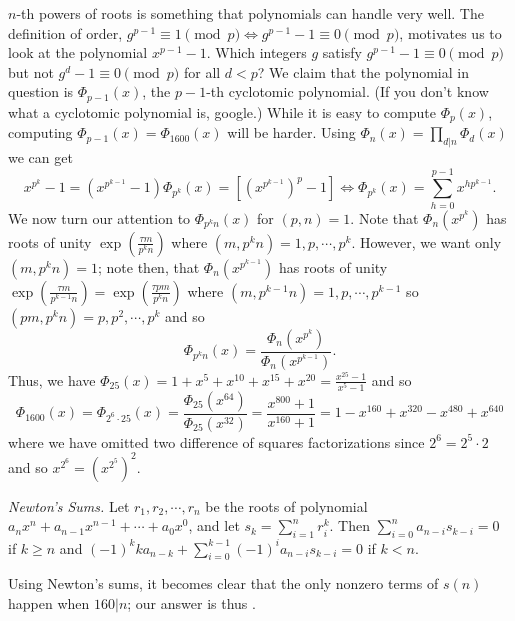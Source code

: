 \begin{solution}\hfil\medskip
	
	$n$-th powers of roots is something that polynomials can handle very well. The definition of order, $g^{p - 1} \equiv 1 \pmod{p} \iff g^{p - 1} - 1 \equiv 0 \pmod{p}$,
	motivates us to look at the polynomial $x^{p - 1} - 1$. Which integers $g$ satisfy $g^{p - 1} - 1 \equiv 0 \pmod{p}$ but not $g^d - 1 \equiv 0 \pmod{p}$ for all 
	$d < p$? We claim that the polynomial in question is $\Phi_{p - 1}(x)$, the $p - 1$-th cyclotomic polynomial. (If you don't know what a cyclotomic polynomial is, google.)
	While it is easy to compute $\Phi_p(x)$, computing $\Phi_{p - 1}(x) = \Phi_{1600}(x)$ will be harder. Using $\Phi_n(x) = \prod_{d|n} \Phi_d(x)$ we can 
	get $$x^{p^k} - 1 = \left(x^{p^{k - 1}} - 1\right) \Phi_{p^k}(x) = \left[\left(x^{p^{k - 1}}\right)^p - 1\right] \iff \Phi_{p^k}(x) = \sum_{h = 0}^{p - 1} x^{hp^{k - 1}}.$$
	We now turn our attention to $\Phi_{p^kn}(x)$ for $(p, n) = 1$. Note that $\Phi_n\left(x^{p^k}\right)$ has roots of unity $\exp\left(\frac{\tau m}{p^kn}\right)$
	where $\left(m, p^kn\right) = 1, p, \cdots , p^k$. However, we want only $\left(m, p^kn\right) = 1$; note then, that $\Phi_n\left(x^{p^{k - 1}}\right)$ has roots of unity
	$\exp\left(\frac{\tau m}{p^{k - 1}n}\right) = \exp\left(\frac{\tau pm}{p^kn}\right)$ where $\left(m, p^{k - 1}n\right) = 1, p, \cdots , p^{k - 1}$ so $\left(pm, p^kn\right) = p, p^2, \cdots , p^k$
	and so $$\Phi_{p^kn}(x) = \dfrac{\Phi_n\left(x^{p^k}\right)}{\Phi_n\left(x^{p^{k - 1}}\right)}.$$
	Thus, we have $\Phi_{25}(x) = 1 + x^5 + x^{10} + x^{15} + x^{20} = \frac{x^{25} - 1}{x^5 - 1}$ and so 
	$$\Phi_{1600}(x) = \Phi_{2^6 \cdot 25}(x) = \dfrac{\Phi_{25}\left(x^{64}\right)}{\Phi_{25}\left(x^{32}\right)} = \dfrac{x^{800} + 1}{x^{160} + 1} = 1 - x^{160} + x^{320} - x^{480} + x^{640}$$
	where we have omitted two difference of squares factorizations since $2^6 = 2^5 \cdot 2$ and so $x^{2^6} = \left(x^{2^5}\right)^2$. \medskip

	\textit{Newton's Sums.} Let $r_1, r_2, \cdots , r_n$ be the roots of polynomial $a_nx^n + a_{n - 1}x^{n - 1} + \cdots + a_0x^0$, and let $s_k = \sum_{i = 1}^n r_i^k$.
	Then $\sum_{i = 0}^n a_{n - i}s_{k - i} = 0$ if $k \geq n$ and $(-1)^kka_{n - k} + \sum_{i = 0}^{k - 1} (-1)^ia_{n - i}s_{k - i} = 0$ if $k < n$. \medskip

	Using Newton's sums, it becomes clear that the only nonzero terms of $s(n)$ happen when $160|n$; our answer is thus .
\end{solution}\newpage


